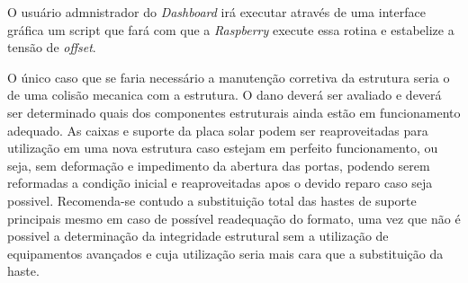 O usuário admnistrador do \textit{Dashboard} irá executar através de uma interface gráfica um script que fará com que a \textit{Raspberry} execute essa rotina e estabelize a tensão de \emph{offset}.

O único caso que se faria necessário a manutenção corretiva da estrutura seria o de uma colisão mecanica com a estrutura. O dano deverá ser avaliado e deverá ser determinado quais dos componentes estruturais ainda estão em funcionamento adequado. As caixas e suporte da placa solar podem ser reaproveitadas para utilização em uma nova estrutura caso estejam em perfeito funcionamento, ou seja, sem deformação e impedimento da abertura das portas, podendo serem reformadas a condição inicial e reaproveitadas apos o devido reparo caso seja possivel. Recomenda-se contudo a substituição total das hastes de suporte principais mesmo em caso de possível readequação do formato, uma vez que não é possivel a determinação da integridade estrutural sem a utilização de equipamentos avançados e cuja utilização seria mais cara que a substituição da haste. 


